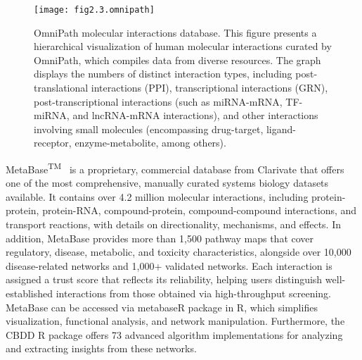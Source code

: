 \begin{figure}[htbp]
    \centering
    \texttt{[image: fig2.3.omnipath]}
    \caption[OmniPath molecular interactions database.]{OmniPath molecular interactions database. This figure presents a hierarchical visualization of human molecular interactions curated by OmniPath, which compiles data from diverse resources. The graph displays the numbers of distinct interaction types, including post-translational interactions (\gls{PPI}), transcriptional interactions (\gls{GRN}), post-transcriptional interactions (such as miRNA-\gls{mRNA}, \gls{TF}-miRNA, and lncRNA-\gls{mRNA} interactions), and other interactions involving small molecules (encompassing drug-target, ligand-receptor, enzyme-metabolite, among others).}
    \label{fig:fig2.3.omnipath}
\end{figure}

MetaBase\textsuperscript{TM}~\cite{RN33} is a proprietary, commercial database from Clarivate that offers one of the most comprehensive, manually curated systems biology datasets available. It contains over 4.2 million molecular interactions, including protein-protein, protein-RNA, compound-protein, compound-compound interactions, and transport reactions, with details on directionality, mechanisms, and effects. In addition, MetaBase provides more than 1,500 pathway maps that cover regulatory, disease, metabolic, and toxicity characteristics, alongside over 10,000 disease-related networks and 1,000+ validated networks. Each interaction is assigned a trust score that reflects its reliability, helping users distinguish well-established interactions from those obtained via high-throughput screening. MetaBase can be accessed via metabaseR package in \gls{R}, which simplifies visualization, functional analysis, and network manipulation. Furthermore, the \gls{CBDD} \gls{R} package offers 73 advanced algorithm implementations for analyzing and extracting insights from these networks.

